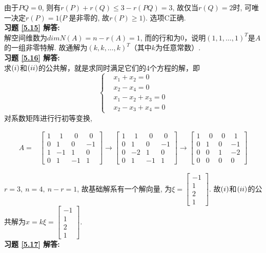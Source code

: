\documentclass[a4paper]{book}
\begin{document}
由于$PQ=0$, 则有$r(P)+r(Q)≤3-r(PQ)=3$, 故仅当$r(Q)=2$时, 可唯一决定$r(P)=1$($P$ 是非零的, 故$r(P)≥1$).  选项C正确.\\
\textbf{习题 \ref{5.15} 解答:}\\
解空间维数为$dimN(A)=n-r(A)=1$, 而的行和为$0$，说明$(1,1,\dots,1)^T$是$A$ 的一组非零特解. 故通解为$(k,k,\dots,k)^T$（其中$k$为任意常数）.\\
\textbf{习题 \ref{5.16} 解答:}\\
求$(\romannumeral 1)$和$(\romannumeral 2)$的公共解，就是求同时满足它们的4个方程的解，即
\begin{displaymath}\left\{\begin{aligned}&x_1+x_2         =0\\&   x_2     -x_4=0\\& x_1-x_2+x_3     =0\\&    x_2-x_3+x_4=0\end{aligned}\right.\end{displaymath}
对系数矩阵进行行初等变换,

\begin{displaymath}
\begin{aligned}
A=&\begin{bmatrix}1&\ \ 1&\ \ 0&\ \ 0\\0&1&0&-1\\1&-1&1&0\\0&1&-1&1 \end{bmatrix}\rightarrow
\begin{bmatrix}1&\ \ 1&\ \ 0&\ \ 0\\0&1&0&-1\\0&-2&1&0\\0&1&-1&1 \end{bmatrix}\rightarrow
\begin{bmatrix} 1&\ \ 0&\ \ 0&\ \ 1\\0&1&0&-1\\0&0&1&-2\\0&0&0&0\end{bmatrix}
\end{aligned} \end{displaymath}

$r=3,\ n=4,\ n-r=1$, 故基础解系有一个解向量, 为$\xi=\begin{bmatrix}-1\\1\\2\\1\end{bmatrix}$. 故$(\romannumeral 1)$和$(\romannumeral 2)$的公共解为$x=k\xi=\begin{bmatrix}-1\\1\\2\\1\end{bmatrix}$.\\
\textbf{习题 \ref{5.17} 解答:}\\
\end{document}
